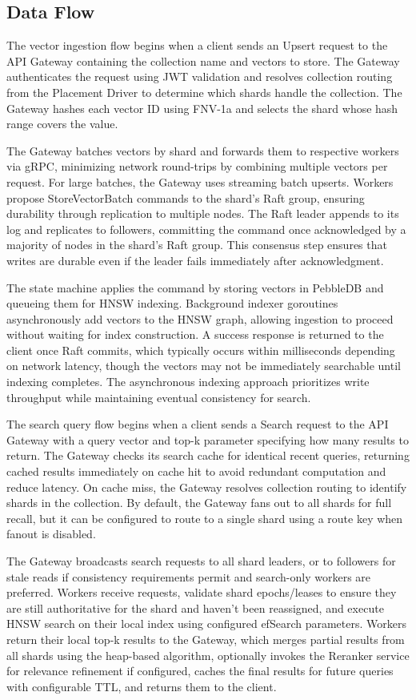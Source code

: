\documentclass[conference]{IEEEtran}
\begin{document}
\subsection{Data Flow}

The vector ingestion flow begins when a client sends an Upsert request to the API Gateway containing the collection name and vectors to store. The Gateway authenticates the request using JWT validation and resolves collection routing from the Placement Driver to determine which shards handle the collection. The Gateway hashes each vector ID using FNV-1a and selects the shard whose hash range covers the value.

The Gateway batches vectors by shard and forwards them to respective workers via gRPC, minimizing network round-trips by combining multiple vectors per request. For large batches, the Gateway uses streaming batch upserts. Workers propose StoreVectorBatch commands to the shard's Raft group, ensuring durability through replication to multiple nodes. The Raft leader appends to its log and replicates to followers, committing the command once acknowledged by a majority of nodes in the shard's Raft group. This consensus step ensures that writes are durable even if the leader fails immediately after acknowledgment.

The state machine applies the command by storing vectors in PebbleDB and queueing them for HNSW indexing. Background indexer goroutines asynchronously add vectors to the HNSW graph, allowing ingestion to proceed without waiting for index construction. A success response is returned to the client once Raft commits, which typically occurs within milliseconds depending on network latency, though the vectors may not be immediately searchable until indexing completes. The asynchronous indexing approach prioritizes write throughput while maintaining eventual consistency for search.

The search query flow begins when a client sends a Search request to the API Gateway with a query vector and top-k parameter specifying how many results to return. The Gateway checks its search cache for identical recent queries, returning cached results immediately on cache hit to avoid redundant computation and reduce latency. On cache miss, the Gateway resolves collection routing to identify shards in the collection. By default, the Gateway fans out to all shards for full recall, but it can be configured to route to a single shard using a route key when fanout is disabled.

The Gateway broadcasts search requests to all shard leaders, or to followers for stale reads if consistency requirements permit and search-only workers are preferred. Workers receive requests, validate shard epochs/leases to ensure they are still authoritative for the shard and haven't been reassigned, and execute HNSW search on their local index using configured efSearch parameters. Workers return their local top-k results to the Gateway, which merges partial results from all shards using the heap-based algorithm, optionally invokes the Reranker service for relevance refinement if configured, caches the final results for future queries with configurable TTL, and returns them to the client.
\end{document}
